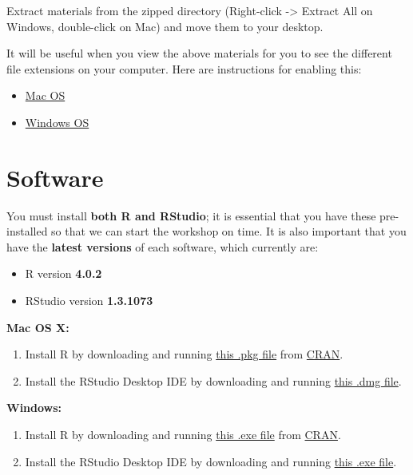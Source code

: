 \documentclass[
]{book}
\providecommand{\tightlist}{%
  \setlength{\itemsep}{0pt}\setlength{\parskip}{0pt}}
\begin{document}
Extract materials from the zipped directory (Right-click -\textgreater{} Extract All on Windows, double-click on Mac) and move them to your desktop.

It will be useful when you view the above materials for you to see the different file extensions on your computer. Here are instructions for enabling this:

\begin{itemize}
\tightlist
\item
  \href{https://support.apple.com/guide/mac-help/show-or-hide-filename-extensions-on-mac-mchlp2304/mac}{Mac OS}
\item
  \href{http://kb.winzip.com/kb/entry/26/}{Windows OS}
\end{itemize}

\hypertarget{software}{%
\section{Software}\label{software}}

You must install \textbf{both R and RStudio}; it is essential that you have these pre-installed so that we can start the workshop on time. It is also important that you have the \textbf{latest versions} of each software, which currently are:

\begin{itemize}
\tightlist
\item
  R version \textbf{4.0.2}
\item
  RStudio version \textbf{1.3.1073}
\end{itemize}

\textbf{Mac OS X:}

\begin{enumerate}
\def\labelenumi{\arabic{enumi}.}
\tightlist
\item
  Install R by downloading and running \href{http://cran.r-project.org/bin/macosx/R-latest.pkg}{this .pkg file} from \href{http://cran.r-project.org/index.html}{CRAN}.
\item
  Install the RStudio Desktop IDE by downloading and running \href{https://download1.rstudio.org/desktop/macos/RStudio-1.3.1073.dmg}{this .dmg file}.
\end{enumerate}

\textbf{Windows:}

\begin{enumerate}
\def\labelenumi{\arabic{enumi}.}
\tightlist
\item
  Install R by downloading and running \href{https://cran.r-project.org/bin/windows/base/release.htm}{this .exe file} from \href{http://cran.r-project.org/index.html}{CRAN}.
\item
  Install the RStudio Desktop IDE by downloading and running \href{https://download1.rstudio.org/desktop/windows/RStudio-1.3.1073.exe}{this .exe file}.
\end{enumerate}
\end{document}

